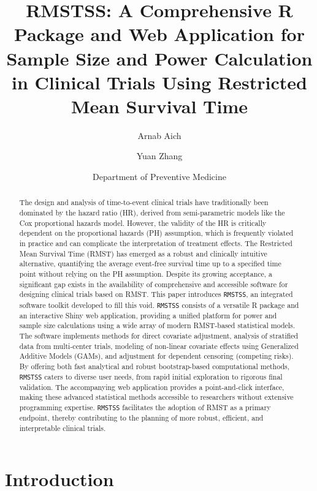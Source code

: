 \documentclass[11pt, a4paper]{article}
\begin{document}
\title{\textbf{RMSTSS: A Comprehensive R Package and Web Application for Sample Size and Power Calculation in Clinical Trials Using Restricted Mean Survival Time}}
\author{Arnab Aich \and Yuan Zhang}
\date{Department of Preventive Medicine}
\maketitle

\begin{abstract}
The design and analysis of time-to-event clinical trials have traditionally been dominated by the hazard ratio (HR), derived from semi-parametric models like the Cox proportional hazards model. However, the validity of the HR is critically dependent on the proportional hazards (PH) assumption, which is frequently violated in practice and can complicate the interpretation of treatment effects. The Restricted Mean Survival Time (RMST) has emerged as a robust and clinically intuitive alternative, quantifying the average event-free survival time up to a specified time point without relying on the PH assumption. Despite its growing acceptance, a significant gap exists in the availability of comprehensive and accessible software for designing clinical trials based on RMST. This paper introduces \texttt{RMSTSS}, an integrated software toolkit developed to fill this void. \texttt{RMSTSS} consists of a versatile R package and an interactive Shiny web application, providing a unified platform for power and sample size calculations using a wide array of modern RMST-based statistical models. The software implements methods for direct covariate adjustment, analysis of stratified data from multi-center trials, modeling of non-linear covariate effects using Generalized Additive Models (GAMs), and adjustment for dependent censoring (competing risks). By offering both fast analytical and robust bootstrap-based computational methods, \texttt{RMSTSS} caters to diverse user needs, from rapid initial exploration to rigorous final validation. The accompanying web application provides a point-and-click interface, making these advanced statistical methods accessible to researchers without extensive programming expertise. \texttt{RMSTSS} facilitates the adoption of RMST as a primary endpoint, thereby contributing to the planning of more robust, efficient, and interpretable clinical trials.
\end{abstract}

\section{Introduction}
\end{document}
